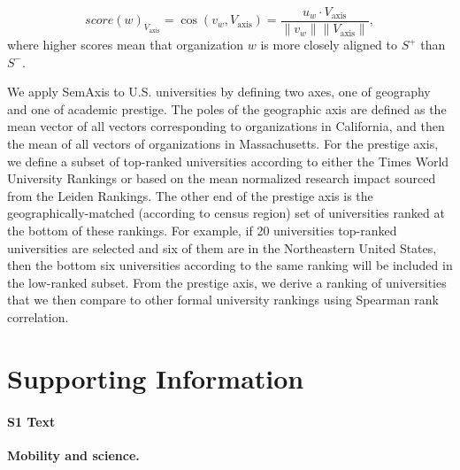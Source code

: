 \documentclass[12pt]{article} %
\newcommand{\beginsupplement}{%
        \setcounter{table}{0}
        \renewcommand{\thetable}{S\arabic{table}}%
        \setcounter{figure}{0}
        \renewcommand{\thefigure}{S\arabic{figure}}%
     }
\begin{document}
$$
score(w)_{V_{\text{axis}}} = \cos(v_{w}, V_{\text{axis}}) = \frac{u_{w} \cdot V_{\text{axis}}}{\lVert v_{w} \rVert \lVert V_{\text{axis}} \rVert},
$$
where higher scores mean that organization $w$ is more closely aligned to $S^+$ than $S^-$.

We apply SemAxis to U.S. universities by defining two axes, one of geography and one of academic prestige.
The poles of the geographic axis are defined as the mean vector of all vectors corresponding to organizations in California, and then the mean of all vectors of organizations in Massachusetts.
For the prestige axis, we define a subset of top-ranked universities according to either the Times World University Rankings or based on the mean normalized research impact sourced from the Leiden Rankings.
The other end of the prestige axis is the geographically-matched (according to census region) set of universities ranked at the bottom of these rankings.
For example, if 20 universities top-ranked universities are selected and six of them are in the Northeastern United States, then the bottom six universities according to the same ranking will be included in the low-ranked subset.
From the prestige axis, we derive a ranking of universities that we then compare to other formal university rankings using Spearman rank correlation. 



\clearpage
\beginsupplement
\section{Supporting Information}



%
%
\paragraph*{S1 Text}
\label{si:text:mobility_science}
{\bf Mobility and science.}
\end{document}
